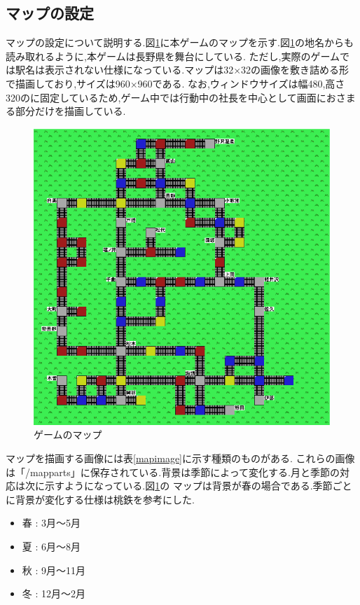 \documentclass[a4j]{jarticle}
\begin{document}
    \subsection{マップの設定}
    マップの設定について説明する.図\ref{map}に本ゲームのマップを示す.図\ref{map}の地名からも読み取れるように,本ゲームは長野県を舞台にしている.
    ただし,実際のゲームでは駅名は表示されない仕様になっている.マップは32$\times$32の画像を敷き詰める形で描画しており,サイズは960$\times$960である.
    なお,ウィンドウサイズは幅480,高さ320のに固定しているため,ゲーム中では行動中の社長を中心として画面におさまる部分だけを描画している.

    \begin{figure}[H]
        \centering
        \includegraphics[scale=1.9]{map.eps}
        \caption{ゲームのマップ}
         \label{map}
        \end{figure}

    マップを描画する画像には表\ref{mapimage}に示す種類のものがある.
    これらの画像は「/mapparts」に保存されている.背景は季節によって変化する.月と季節の対応は次に示すようになっている.図\ref{map}の
    マップは背景が春の場合である.季節ごとに背景が変化する仕様は桃鉄を参考にした.
    \begin{itemize}
        \item 春 : 3月～5月 
        \item 夏 : 6月～8月 
        \item 秋 : 9月～11月 
        \item 冬 : 12月～2月 
      \end{itemize}
\end{document}
